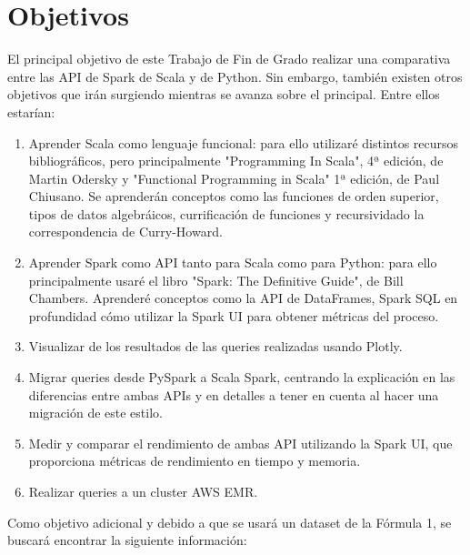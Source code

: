 \documentclass[12pt,twoside,titlepage]{report}
\newcommand\blankpage{%
    \newpage
    \null
    \thispagestyle{empty}%
    \newpage}
\begin{document}







\chapter{Objetivos}
\newpage

El principal objetivo de este Trabajo de Fin de Grado realizar una comparativa entre las API de Spark de Scala y de Python. Sin embargo, también existen otros objetivos que irán surgiendo mientras se avanza sobre el principal. Entre ellos estarían:

\begin{enumerate}
  \item Aprender Scala como lenguaje funcional: para ello utilizaré distintos recursos bibliográficos, pero principalmente "Programming In Scala", 4ª edición, de Martin Odersky y "Functional Programming in Scala" 1ª edición, de Paul Chiusano. Se aprenderán conceptos como las funciones de orden superior, tipos de datos algebráicos, currificación de funciones y recursividado la correspondencia de Curry-Howard.
  \item Aprender Spark como API tanto para Scala como para Python: para ello principalmente usaré el libro "Spark: The Definitive Guide", de Bill Chambers. Aprenderé conceptos como la API de DataFrames, Spark SQL en profundidad cómo utilizar la Spark UI para obtener métricas del proceso.
  \item Visualizar de los resultados de las queries realizadas usando Plotly. 
  \item Migrar queries desde PySpark a Scala Spark, centrando la explicación en las diferencias entre ambas APIs y en detalles a tener en cuenta al hacer una migración de este estilo.
  \item Medir y comparar el rendimiento de ambas API utilizando la Spark UI, que proporciona métricas de rendimiento en tiempo y memoria.
  \item Realizar queries a un cluster AWS EMR.
\end{enumerate}

Como objetivo adicional y debido a que se usará un dataset de la Fórmula 1, se buscará encontrar la siguiente información:
\end{document}
